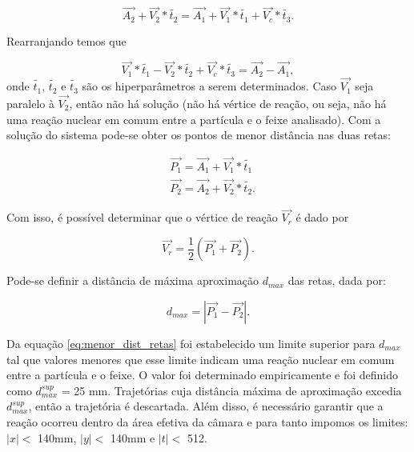\documentclass[a4paper,12pt,oneside]{book}
\begin{document}
\begin{equation*}
    \vec{A_2} + \vec{V_2} * \tilde{t_2} = \vec{A_1} + \vec{V_1} * \tilde{t_1} + \vec{V_c} * \tilde{t_3}.
\end{equation*}

Rearranjando temos que

\begin{equation}\label{eq:sistema_vertice}
    \vec{V_1} * \tilde{t_1} - \vec{V_2} * \tilde{t_2} + \vec{V_c} * \tilde{t_3} = \vec{A_2} - \vec{A_1},
\end{equation}
%
onde $\tilde{t_1}$, $\tilde{t_2}$ e $\tilde{t_3}$ são os hiperparâmetros a serem determinados. Caso $\vec{V_1}$ seja paralelo à $\vec{V_2}$, então não há solução (não há vértice de reação, ou seja, não há uma reação nuclear em comum entre a partícula e o feixe analisado). Com a solução do sistema pode-se obter os pontos de menor distância nas duas retas:

\begin{equation}
\begin{split}
        &\vec{P_1} = \vec{A_1} + \vec{V_1} * \tilde{t_1} \\
        &\vec{P_2} = \vec{A_2} + \vec{V_2} * \tilde{t_2}.
\end{split}
\end{equation}

\par Com isso, é possível determinar que o vértice de reação $\vec{V_r}$ é dado por

\begin{equation} \label{eq:vertice_reacao}
    \vec{V_r} = \frac{1}{2}(\vec{P_1} + \vec{P_2}).
\end{equation}

\par Pode-se definir a distância de máxima aproximação $d_{max}$ das retas, dada por:

\begin{equation} \label{eq:menor_dist_retas}
    d_{max} = \left | \vec{P_1} - \vec{P_2} \right |.
\end{equation}


\par Da equação \ref{eq:menor_dist_retas} foi estabelecido um limite superior para $d_{max}$ tal que valores menores que esse limite indicam uma reação nuclear em comum entre a partícula e o feixe. O valor foi determinado empiricamente e foi definido como $d_{max}^{sup}$ = 25 mm. Trajetórias cuja distância máxima de aproximação excedia $d_{max}^{sup}$, então a trajetória é descartada. Além disso, é necessário garantir que a reação ocorreu dentro da área efetiva da câmara e para tanto impomos os limites: $|x| < $ 140mm, $|y| < $ 140mm e $|t| < $ 512.
\end{document}
